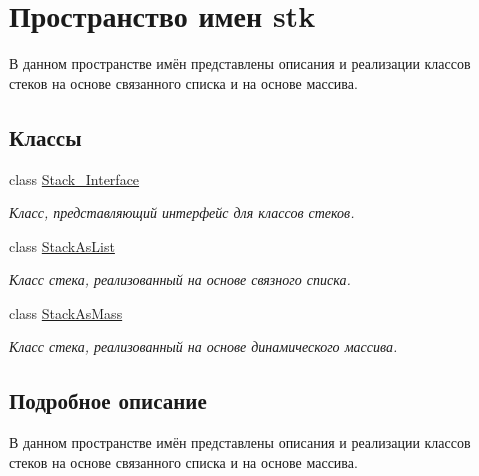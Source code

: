 \hypertarget{namespacestk}{}\section{Пространство имен stk}
\label{namespacestk}


В данном пространстве имён представлены описания и реализации классов стеков на основе связанного списка и на основе массива.  


\subsection*{Классы}
\begin{DoxyCompactItemize}
\item 
class \hyperlink{classstk_1_1_stack___interface}{Stack\+\_\+\+Interface}
\begin{DoxyCompactList}\small\item\em Класс, представляющий интерфейс для классов стеков. \end{DoxyCompactList}\item 
class \hyperlink{classstk_1_1_stack_as_list}{Stack\+As\+List}
\begin{DoxyCompactList}\small\item\em Класс стека, реализованный на основе связного списка. \end{DoxyCompactList}\item 
class \hyperlink{classstk_1_1_stack_as_mass}{Stack\+As\+Mass}
\begin{DoxyCompactList}\small\item\em Класс стека, реализованный на основе динамического массива. \end{DoxyCompactList}\end{DoxyCompactItemize}


\subsection{Подробное описание}
В данном пространстве имён представлены описания и реализации классов стеков на основе связанного списка и на основе массива. 